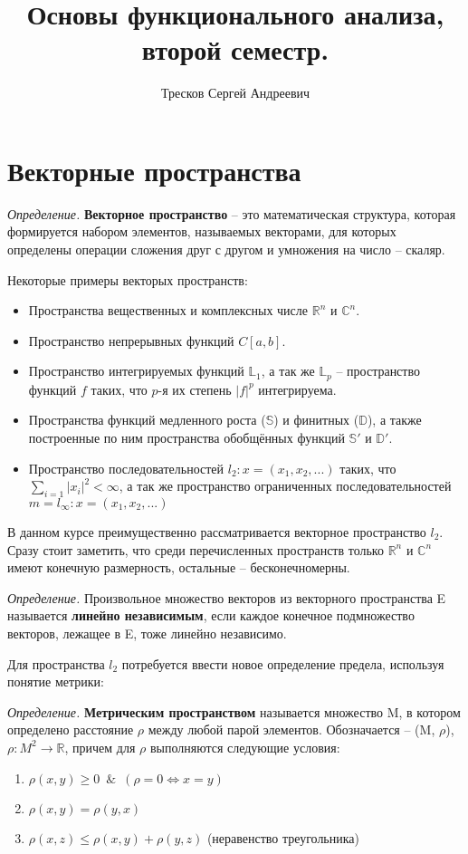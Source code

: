 \documentclass[12pt]{article}
\newcommand{\equals}{\Leftrightarrow}
\newcommand{\defi}{{\itshape Определение. }}
\renewcommand{\leq}{\leqslant}
\renewcommand{\geq}{\geqslant}
\begin{document}
	\title{Основы функционального анализа, второй семестр.}
	\author{Тресков Сергей Андреевич}
	\maketitle
	
	\section{Векторные пространства}
	
	\defi \textbf{Векторное пространство} -- это математическая структура, которая формируется набором элементов, называемых векторами, для которых определены операции сложения друг с другом и умножения на число -- скаляр.

	Некоторые примеры векторых пространств:
		\begin{itemize}
			\item Пространства вещественных и комплексных числе $\mathbb{R}^n$ и $\mathbb{C}^n$.
			\item Пространство непрерывных функций $C[a,b]$.
			\item Пространство интегрируемых функций $\mathbb{L}_1$, а так же $\mathbb{L}_p$ -- пространство функций $f$ таких, что $p$-я их степень $|f|^p$ интегрируема.
			\item Пространства функций медленного роста ($\mathbb{S}$) и финитных ($\mathbb{D}$), а также построенные по ним пространства обобщённых функций $\mathbb{S}'$ и $\mathbb{D}'$.
			\item Пространство последовательностей $l_2 : x = (x_1, x_2, ...)$ таких, что $\sum_{i=1} |x_i|^2 < \infty$, а так же пространство ограниченных последовательностей $m = l_\infty : x = (x_1, x_2, ...)$
		\end{itemize}

	В данном курсе преимущественно рассматривается векторное пространство $l_2$. Сразу стоит заметить, что среди перечисленных пространств только $\mathbb{R}^n$ и $\mathbb{C}^n$ имеют конечную размерность, остальные -- бесконечномерны.
	
	\defi Произвольное множество векторов из векторного пространства E называется \textbf{линейно независимым}, если каждое конечное
	подмножество векторов, лежащее в E, тоже линейно независимо.
	
	Для пространства $l_2$ потребуется ввести новое определение предела, используя понятие метрики:
	
	\defi \textbf{Метрическим пространством} называется множество M, в котором определено расстояние $\rho$ между любой парой элементов. Обозначается -- (M, $\rho$), $\rho : M^2 \rightarrow 
	\mathbb{R}$, причем для $\rho$ выполняются следующие условия:
	\begin{enumerate}
		\item $\rho(x,y) \geq 0$~$\&$~$(\rho = 0 \equals x=y)$
		\item $\rho(x,y) = \rho(y,x)$
		\item $\rho(x,z) \leq \rho(x,y) + \rho(y,z)$ (неравенство треугольника)
	\end{enumerate}
	
\end{document}
